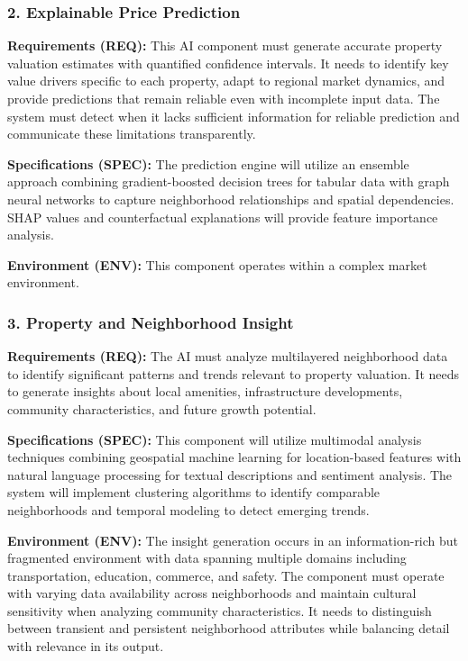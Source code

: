 \subsubsection*{2. Explainable Price Prediction}

\textbf{Requirements (REQ):} This AI component must generate accurate property valuation estimates with quantified confidence intervals. It needs to identify key value drivers specific to each property, adapt to regional market dynamics, and provide predictions that remain reliable even with incomplete input data. The system must detect when it lacks sufficient information for reliable prediction and communicate these limitations transparently.

\textbf{Specifications (SPEC):} The prediction engine will utilize an ensemble approach combining gradient-boosted decision trees for tabular data with graph neural networks to capture neighborhood relationships and spatial dependencies. SHAP values and counterfactual explanations will provide feature importance analysis.

\textbf{Environment (ENV):} This component operates within a complex market environment.

\subsubsection*{3. Property and Neighborhood Insight}

\textbf{Requirements (REQ):} The AI must analyze multilayered neighborhood data to identify significant patterns and trends relevant to property valuation. It needs to generate insights about local amenities, infrastructure developments, community characteristics, and future growth potential.

\textbf{Specifications (SPEC):} This component will utilize multimodal analysis techniques combining geospatial machine learning for location-based features with natural language processing for textual descriptions and sentiment analysis. The system will implement clustering algorithms to identify comparable neighborhoods and temporal modeling to detect emerging trends.

\textbf{Environment (ENV):} The insight generation occurs in an information-rich but fragmented environment with data spanning multiple domains including transportation, education, commerce, and safety. The component must operate with varying data availability across neighborhoods and maintain cultural sensitivity when analyzing community characteristics. It needs to distinguish between transient and persistent neighborhood attributes while balancing detail with relevance in its output.

